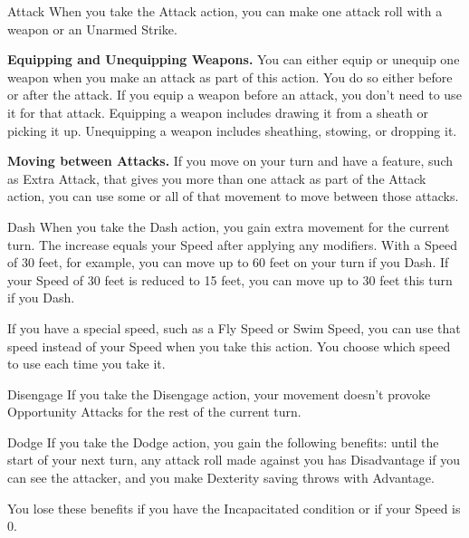 


\pagestyle{empty}

\begin{Card}[Action]{Attack}
When you take the Attack action, you can make one attack roll with a weapon or an Unarmed Strike.

\textbf{Equipping and Unequipping Weapons.} You can either equip or unequip one weapon when you make an attack as part of this action. You do so either before or after the attack. If you equip a weapon before an attack, you don't need to use it for that attack. Equipping a weapon includes drawing it from a sheath or picking it up. Unequipping a weapon includes sheathing, stowing, or dropping it.

\textbf{Moving between Attacks.} If you move on your turn and have a feature, such as Extra Attack, that gives you more than one attack as part of the Attack action, you can use some or all of that movement to move between those attacks.
\end{Card}


\begin{Card}[Action]{Dash}
When you take the Dash action, you gain extra movement for the current turn. The increase equals your Speed after applying any modifiers. With a Speed of 30 feet, for example, you can move up to 60 feet on your turn if you Dash. If your Speed of 30 feet is reduced to 15 feet, you can move up to 30 feet this turn if you Dash.

If you have a special speed, such as a Fly Speed or Swim Speed, you can use that speed instead of your Speed when you take this action. You choose which speed to use each time you take it.
\end{Card}


\begin{Card}[Action]{Disengage}
If you take the Disengage action, your movement doesn't provoke Opportunity Attacks for the rest of the current turn.
\end{Card}


\begin{Card}[Action]{Dodge}
If you take the Dodge action, you gain the following benefits: until the start of your next turn, any attack roll made against you has Disadvantage if you can see the attacker, and you make Dexterity saving throws with Advantage.

You lose these benefits if you have the Incapacitated condition or if your Speed is 0.
\end{Card}


